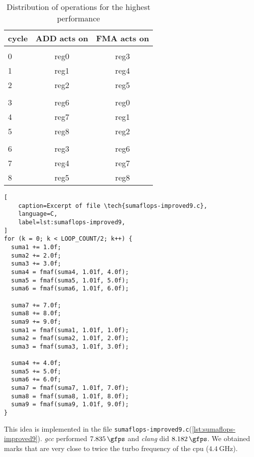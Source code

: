 \documentclass[
    12pt, %
]{fphw}
\newcommand{\tech}{\texttt}
\newcommand{\gcc}{\textit{gcc}}
\newcommand{\clang}{\textit{clang}}
\begin{document}
\begin{table}[h]
    \centering
    \caption{Distribution of operations for the highest performance}
    \begin{tabular}{l||c c}
        cycle & ADD acts on & FMA acts on \\
        \hline \hline \\
        0 & reg0 & reg3 \\
        1 & reg1 & reg4 \\
        2 & reg2 & reg5 \\
        \\
        3 & reg6 & reg0 \\
        4 & reg7 & reg1 \\
        5 & reg8 & reg2 \\
        \\
        6 & reg3 & reg6 \\
        7 & reg4 & reg7 \\
        8 & reg5 & reg8 \\
    \end{tabular}
\end{table}

\begin{lstlisting}[
    caption=Excerpt of file \tech{sumaflops-improved9.c},
    language=C,
    label=lst:sumaflops-improved9,
]
for (k = 0; k < LOOP_COUNT/2; k++) {
  suma1 += 1.0f;
  suma2 += 2.0f;
  suma3 += 3.0f;
  suma4 = fmaf(suma4, 1.01f, 4.0f);
  suma5 = fmaf(suma5, 1.01f, 5.0f);
  suma6 = fmaf(suma6, 1.01f, 6.0f);

  suma7 += 7.0f;
  suma8 += 8.0f;
  suma9 += 9.0f;
  suma1 = fmaf(suma1, 1.01f, 1.0f);
  suma2 = fmaf(suma2, 1.01f, 2.0f);
  suma3 = fmaf(suma3, 1.01f, 3.0f);

  suma4 += 4.0f;
  suma5 += 5.0f;
  suma6 += 6.0f;
  suma7 = fmaf(suma7, 1.01f, 7.0f);
  suma8 = fmaf(suma8, 1.01f, 8.0f);
  suma9 = fmaf(suma9, 1.01f, 9.0f);
}
\end{lstlisting}

    This idea is implemented in the file
\tech{sumaflops-improved9.c}(\cref{lst:sumaflops-improved9}).
\gcc{} performed $\SI{7.835}{\gfps}$ and \clang{} did $\SI{8.182}{\gfps}$.
We obtained marks that are very close to twice the turbo frequency of the cpu
($\SI{4.4}{\GHz}$).

\end{document}
